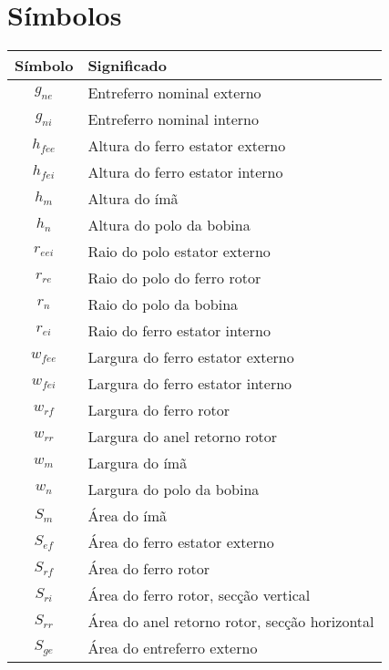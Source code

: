 \chapter*{Símbolos}

\begin{longtable}{c l}
Símbolo &  Significado \\ 
\hline \hline

	$g_{ne}$	& Entreferro nominal externo \\
	$g_{ni}$	& Entreferro nominal interno \\

	$h_{fee}$	& Altura do ferro estator externo \\
	$h_{fei}$	& Altura do ferro estator interno \\
	$h_m$		& Altura do ímã \\
	$h_n$		& Altura do polo da bobina \\
	
	$r_{eei}$	& Raio do polo estator externo \\				
	$r_{re}$	& Raio do polo do ferro rotor \\		
	$r_{n}$		& Raio do polo da bobina \\		
	$r_{ei}$	& Raio do ferro estator interno \\	

	$w_{fee}$	& Largura do ferro estator externo\\
	$w_{fei}$	& Largura do ferro estator interno \\
	$w_{rf}$	& Largura do ferro rotor \\
	$w_{rr}$	& Largura do anel retorno rotor \\
	$w_m$		& Largura do ímã \\
	$w_n$		& Largura do polo da bobina \\

	$S_m$		& Área do ímã\\	
	$S_{ef}$	& Área do ferro estator externo \\
	$S_{rf}$	& Área do ferro rotor\\
	$S_{ri}$	& Área do ferro rotor, secção vertical \\
	$S_{rr}$	& Área do anel retorno rotor, secção horizontal\\
	$S_{ge}$	& Área do entreferro externo\\


\end{longtable}
